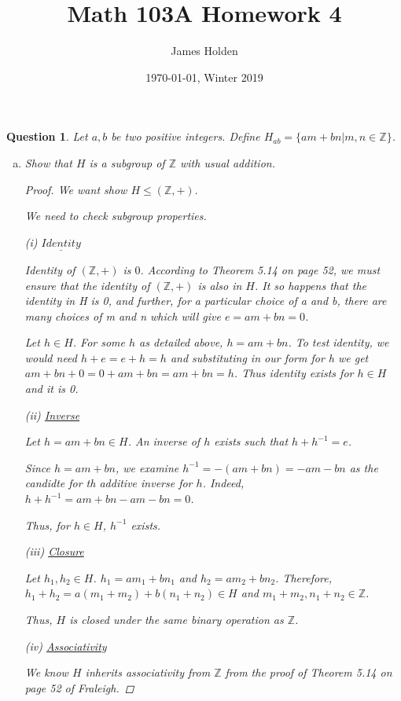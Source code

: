 \documentclass{article}
\title{Math 103A Homework 4}
\date{\today $ $, Winter 2019}
\author{James Holden}
\newcommand*{\field}[1]{\mathbb{#1}}%
\newtheorem{ques}{Question}
\begin{document}
\maketitle

\begin{ques}
	Let $a,b$ be two positive integers. Define $H_{ab} = \{am + bn | m,n \in \field{Z}\}$.
	
	
\begin{enumerate}[(a)]
	\item 
	Show that $H$ is a subgroup of $\field{Z}$ with usual addition.
	\begin{proof}
		We want show $H \leq (\field{Z}, +).$
		
		We need to check subgroup properties.
		
		(i) $\underline{Identity}$
		
			Identity of $(\field{Z}, +)$ is $0$. According to Theorem 5.14 on page 52, we must ensure that the identity of $(\field{Z}, +)$ is also in $H$. It so happens that the identity in H is 0, and further, for a particular choice of a and b, there are many choices of m and n which will give $e=am+bn=0$.
			
			Let $h \in H$. For some $h$ as detailed above, $h = am + bn$. To test identity, we would need $h + e = e + h = h$ and substituting in our form for h we get $am + bn + 0 = 0+ am + bn = am+bn =h$. Thus identity exists for $h \in H$ and it is 0.
		
		(ii) \underline{Inverse}
		
			Let $h = am + bn \in H$. An inverse of $h$ exists such that $h + h^{-1} = e$.
			
			Since $h = am + bn$, we examine $h^{-1} = -(am + bn) = -am - bn$ as the candidte for th additive inverse for $h$. Indeed, $h + h^{-1} = am + bn - am - bn = 0$.
			
			Thus, for $h \in H$, $h^{-1}$ exists.
		
		(iii) \underline{Closure}
		
			Let $h_1,h_2 \in H$. $h_1 = am_1 + bn_1$ and $h_2 = am_2 + bn_2$. Therefore, $h_1 + h_2 = a(m_1 + m_2) + b(n_1 + n_2) \in H$ and $m_1 +m_2, n_1+n_2 \in \field{Z}$. 
			
			Thus, $H$ is closed under the same binary operation as $\field{Z}$.
		
		(iv) \underline{Associativity}
		
			We know $H$ inherits associativity from $\field{Z}$ from the proof of Theorem 5.14 on page 52 of Fraleigh.
			

\end{proof}
\end{enumerate}
\end{ques}
\end{document}

